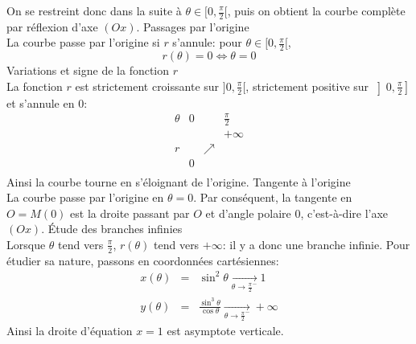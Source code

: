 {\begin{enumerate}
{\begin{itemize}
On se restreint donc dans la suite à $\theta\in[0,\frac{\pi}{2}[$, puis on obtient la courbe 
complète par réflexion d'axe $(Ox)$.
Passages par l'origine\\
La courbe passe par l'origine si $r$ s'annule: pour $\theta\in[0,\frac{\pi}{2}[$,
$$r(\theta)=0\Longleftrightarrow\theta=0$$
Variations et signe de la fonction $r$\\
La fonction $r$ est strictement croissante sur $]0,\frac{\pi}{2}[$, 
strictement positive sur $\left]0,\frac{\pi}{2}\right]$ et s'annule en $0$:
$$\begin{array}{c|lcr}
\theta&0&\ &\frac{\pi}{2}\\\hline
\ & &\ & +\infty\\
r&\ &\nearrow &\ \\
 &0 &\ & \\
\end{array}$$
Ainsi la courbe tourne en s'éloignant de l'origine.
Tangente à l'origine\\
La courbe passe par l'origine en $\theta=0$. Par conséquent, la tangente en $O=M\left(0\right)$ est la droite passant par $O$ et d'angle polaire $0$, c'est-à-dire l'axe $(Ox)$.
\'Etude des branches infinies\\
Lorsque $\theta$ tend vers $\frac{\pi}{2}$, $r(\theta)$ tend vers $+\infty$: il y a donc une branche infinie. Pour étudier sa nature, passons en coordonnées cartésiennes:
\begin{eqnarray*}
x(\theta)&=&\sin^2\theta\xrightarrow[\theta\to \frac{\pi}{2}^-]{}1\\
y(\theta)&=&\frac{\sin^3\theta}{\cos\theta}\xrightarrow[\theta\to \frac{\pi}{2}^-]{}+\infty
\end{eqnarray*}
Ainsi la droite d'équation $x=1$ est asymptote verticale. 
\end{itemize}


\begin{center}
\end{center}}
\end{enumerate}}
